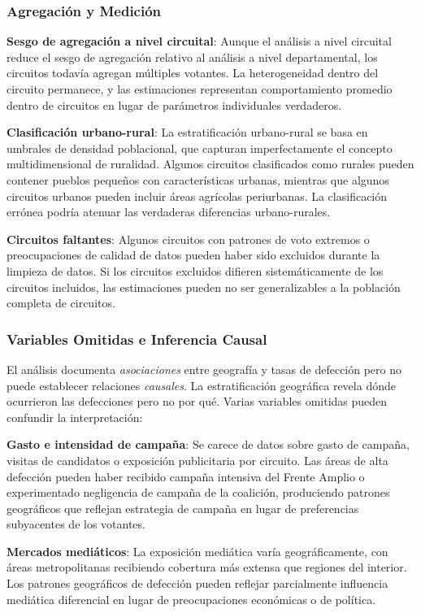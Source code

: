\subsubsection{Agregación y Medición}

\textbf{Sesgo de agregación a nivel circuital}: Aunque el análisis a nivel circuital reduce el sesgo de agregación relativo al análisis a nivel departamental, los circuitos todavía agregan múltiples votantes. La heterogeneidad dentro del circuito permanece, y las estimaciones representan comportamiento promedio dentro de circuitos en lugar de parámetros individuales verdaderos.

\textbf{Clasificación urbano-rural}: La estratificación urbano-rural se basa en umbrales de densidad poblacional, que capturan imperfectamente el concepto multidimensional de ruralidad. Algunos circuitos clasificados como rurales pueden contener pueblos pequeños con características urbanas, mientras que algunos circuitos urbanos pueden incluir áreas agrícolas periurbanas. La clasificación errónea podría atenuar las verdaderas diferencias urbano-rurales.

\textbf{Circuitos faltantes}: Algunos circuitos con patrones de voto extremos o preocupaciones de calidad de datos pueden haber sido excluidos durante la limpieza de datos. Si los circuitos excluidos difieren sistemáticamente de los circuitos incluidos, las estimaciones pueden no ser generalizables a la población completa de circuitos.

\subsubsection{Variables Omitidas e Inferencia Causal}

El análisis documenta \textit{asociaciones} entre geografía y tasas de defección pero no puede establecer relaciones \textit{causales}. La estratificación geográfica revela dónde ocurrieron las defecciones pero no por qué. Varias variables omitidas pueden confundir la interpretación:

\textbf{Gasto e intensidad de campaña}: Se carece de datos sobre gasto de campaña, visitas de candidatos o exposición publicitaria por circuito. Las áreas de alta defección pueden haber recibido campaña intensiva del Frente Amplio o experimentado negligencia de campaña de la coalición, produciendo patrones geográficos que reflejan estrategia de campaña en lugar de preferencias subyacentes de los votantes.

\textbf{Mercados mediáticos}: La exposición mediática varía geográficamente, con áreas metropolitanas recibiendo cobertura más extensa que regiones del interior. Los patrones geográficos de defección pueden reflejar parcialmente influencia mediática diferencial en lugar de preocupaciones económicas o de política.

